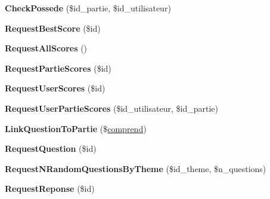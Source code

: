 \begin{DoxyCompactItemize}
\item 
\mbox{\label{class_interface_b_d_d_abdd3159f3f18a5aba6f1f29907489073}} 
{\bfseries Check\+Possede} (\$id\+\_\+partie, \$id\+\_\+utilisateur)
\item 
\mbox{\label{class_interface_b_d_d_ac5d8ed61cc01eba73c0060a4561702dd}} 
{\bfseries Request\+Best\+Score} (\$id)
\item 
\mbox{\label{class_interface_b_d_d_a4d1d3a0c3fed3edec5e93a039e5cc15a}} 
{\bfseries Request\+All\+Scores} ()
\item 
\mbox{\label{class_interface_b_d_d_aeb87620551f2e3cd7a7aac388d857534}} 
{\bfseries Request\+Partie\+Scores} (\$id)
\item 
\mbox{\label{class_interface_b_d_d_a0e5add57564c5205c91a6bc6c8b1dcdb}} 
{\bfseries Request\+User\+Scores} (\$id)
\item 
\mbox{\label{class_interface_b_d_d_a71f154f1bff6e6659dddefcde250f993}} 
{\bfseries Request\+User\+Partie\+Scores} (\$id\+\_\+utilisateur, \$id\+\_\+partie)
\item 
\mbox{\label{class_interface_b_d_d_a230a88f1d16eb95926e03544b4a75279}} 
{\bfseries Link\+Question\+To\+Partie} (\$\mbox{\hyperlink{classcomprend}{comprend}})
\item 
\mbox{\label{class_interface_b_d_d_a363d433b9362a9d7e70c3b88f665c6e2}} 
{\bfseries Request\+Question} (\$id)
\item 
\mbox{\label{class_interface_b_d_d_aa55c97f41f0473692fa3c3be52b16d91}} 
{\bfseries Request\+N\+Random\+Questions\+By\+Theme} (\$id\+\_\+theme, \$n\+\_\+questions)
\item 
\mbox{\label{class_interface_b_d_d_a653d317c29317946ca25680b7ce39c98}} 
{\bfseries Request\+Reponse} (\$id)
\item 
\mbox{\label{class_interface_b_d_d_aeb7156b09f5a9ee1a472bdaf3ef603b3}} 

\end{DoxyCompactItemize}
